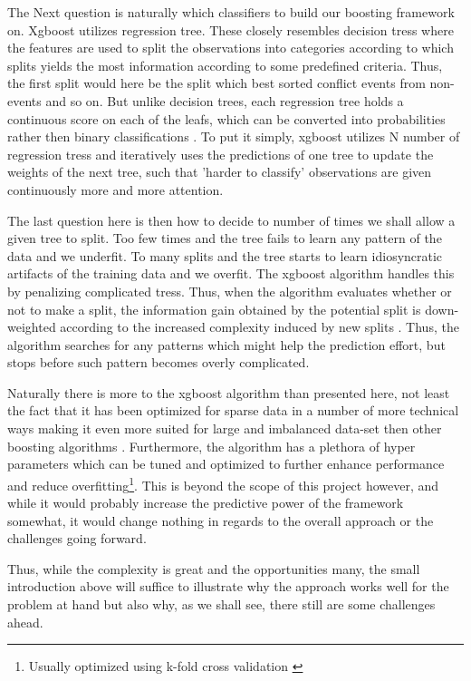 \documentclass[a4paper]{article}
\begin{document}
The Next question is naturally which classifiers to build our boosting framework on. Xgboost utilizes regression tree. These closely resembles decision tress where the features are used to split the observations into categories according to which splits yields the most information according to some predefined criteria. Thus, the first split would here be the split which best sorted conflict events from non-events and so on. But unlike decision trees, each regression tree holds a continuous score on each of the leafs, which can be converted into probabilities rather then binary classifications \citep[2]{Chen_2016}. To put it simply, xgboost utilizes N number of regression tress and iteratively uses the predictions of one tree to update the weights of the next tree, such that 'harder to classify' observations are given continuously more and more attention.\par

The last question here is then how to decide to number of times we shall allow a given tree to split. Too few times and the tree fails to learn any pattern of the data and we underfit. To many splits and the tree starts to learn idiosyncratic artifacts of the training data and we overfit. The xgboost algorithm handles this by penalizing complicated tress. Thus, when the algorithm evaluates whether or not to make a split, the information gain obtained by the potential split is down-weighted according to the increased complexity induced by new splits \cite[4-7]{Chen_2016}. Thus, the algorithm searches for any patterns which might help the prediction effort, but stops before such pattern becomes overly complicated.\par 

Naturally there is more to the xgboost algorithm than presented here, not least the fact that it has been optimized for sparse data in a number of more technical ways making it even more suited for large and imbalanced data-set then other boosting algorithms \cite[5]{Chen_2016}. Furthermore, the algorithm has a plethora of hyper parameters which can be tuned and optimized to further enhance performance and reduce overfitting\footnote{Usually optimized using k-fold cross validation \citep[241-249]{Friedman_2001}}. This is beyond the scope of this project however, and while it would probably increase the predictive power of the framework somewhat, it would change nothing in regards to the overall approach or the challenges going forward.\par 

Thus, while the complexity is great and the opportunities many, the small introduction above will suffice to illustrate why the approach works well for the problem at hand but also why, as we shall see, there still are some challenges ahead.\par
\end{document}
